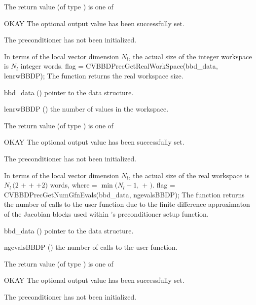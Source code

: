 {
  The return value  (of type ) is one of
  \begin{args}
  \item[OKAY] 
    The optional output value has been successfully set.
  \item[\Id{BBDP\_NO\_DATA}]
    The {\cvbbdpre} preconditioner has not been initialized.
  \end{args}
}
{
  In terms of the local vector dimension $N_{l}$, the actual size of the integer workspace
  is $N_l$ integer words.
}
{
  flag = CVBBDPrecGetRealWorkSpace(bbd\_data, lenrwBBDP);
}
{
  The function  returns the
  {\cvbbdpre} real workspace size.
}
{
  \begin{args}[lenrwBBDP]
  \item[bbd\_data] ()
    pointer to the {\cvbbdpre} data structure.
  \item[lenrwBBDP] ()
    the number of  values in the {\cvbbdpre} workspace.
  \end{args}
}
{
  The return value  (of type ) is one of
  \begin{args}
  \item[OKAY] 
    The optional output value has been successfully set.
  \item[\Id{BBDP\_NO\_DATA}]
    The {\cvbbdpre} preconditioner has not been initialized.
  \end{args}
}
{
  In terms of the local vector dimension $N_l$, the actual size of the real workspace is
  $N_l \,(2$  $+$  $+$  $+2)$  words,
  where  = $\min ( N_l - 1 ,$  $+$ $)$.
}
{
  flag = CVBBDPrecGetNumGfnEvals(bbd\_data, ngevalsBBDP);
}
{
  The function  returns the
  number of calls to the user  function due to the 
  finite difference approximaton of the Jacobian blocks used within
  {\cvbbdpre}'s preconditioner setup function.
}
{
  \begin{args}[ngevalsBBDP]
  \item[bbd\_data] ()
    pointer to the {\cvbbdpre} data structure.
  \item[ngevalsBBDP] ()
    the number of calls to the user  function.
  \end{args}
}
{
  The return value  (of type ) is one of
  \begin{args}
  \item[OKAY] 
    The optional output value has been successfully set.
  \item[\Id{BBDP\_NO\_DATA}]
    The {\cvbbdpre} preconditioner has not been initialized.
  \end{args}
}
{}

